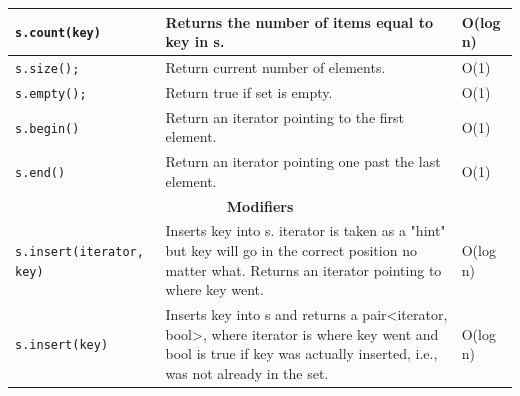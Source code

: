 \documentclass[12 pt, twoside] {article}
\begin{document}
{\begin{table}[h]
\begin{tabular}{|l|p{}|l|}
\texttt{s.count(key) }                                          & Returns the number of items equal to key in s.                                                                                                                                              & O(log n)   \\ \hline
\texttt{s.size();    }                                          & Return current number of elements.                                                                                                                                                          & O(1)       \\ \hline
\texttt{s.empty();   }                                          & Return true if set is empty.                                                                                                                                                                & O(1)       \\ \hline
\texttt{s.begin()    }                                          & Return an iterator pointing to the first element.                                                                                                                                           & O(1)       \\ \hline
\texttt{s.end()      }                                          & Return an iterator pointing one past the last element.                                                                                                                                      & O(1)       \\ \hline
\multicolumn{3}{|c|}{\textbf{Modifiers}}                                                                                                                                                                                                                          \\ \hline
\texttt{s.insert(iterator, key)}                                & Inserts key into s. iterator is taken as a "hint" but key will go in the correct position no matter what. Returns an iterator pointing to where key went.                                   & O(log n)   \\ \hline
\texttt{s.insert(key)          }                                & Inserts key into s and returns a pair\textless iterator, bool\textgreater, where iterator is where key went and bool is true if key was actually inserted, i.e., was not already in the set. & O(log n)   \\ \hline
\end{tabular}%
\end{table}
\newpage
}
\end{document}

